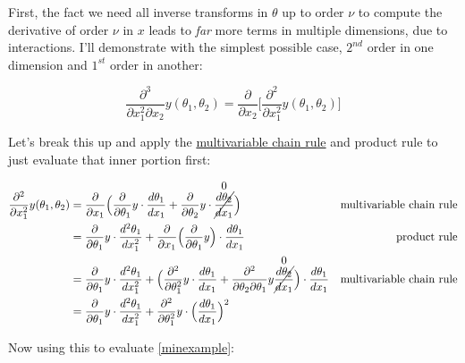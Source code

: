 \documentclass[10pt]{article}
\begin{document}
First, the fact we need all inverse transforms in $\theta$ up to order $\nu$ to compute the derivative of order $\nu$ in $x$ leads to \textit{far} more terms in multiple dimensions, due to interactions. I'll demonstrate with the simplest possible case, $2^{nd}$ order in one dimension and $1^{st}$ order in another:

\begin{equation}\label{minexample}
\frac{\partial^3}{\partial x_1^2 \partial x_2} y(\theta_1, \theta_2) = \frac{\partial}{\partial x_2} \Big[ \frac{\partial^2}{\partial x_1^2} y(\theta_1, \theta_2) \Big]
\end{equation}

Let's break this up and apply the \href{https://math.libretexts.org/Bookshelves/Calculus/Calculus_(OpenStax)/14%3A_Differentiation_of_Functions_of_Several_Variables/14.05%3A_The_Chain_Rule_for_Multivariable_Functions}{multivariable chain rule}\cite{chainrule} and product rule to just evaluate that inner portion first:

\begin{align*}
\frac{\partial^2}{\partial x_1^2} y(\theta_1, \theta_2) &= \frac{\partial}{\partial x_1} \Big( \frac{\partial}{\partial \theta_1} y \cdot \frac{d\theta_1}{dx_1} + \frac{\partial}{\partial \theta_2} y \cdot \overset{\text{\normalsize 0}}{\cancel{\frac{d\theta_2}{dx_1}}} \Big) & \text{multivariable chain rule}\\
&= \frac{\partial}{\partial \theta_1} y \cdot \frac{d^2 \theta_1}{dx_1^2} + \frac{\partial}{\partial x_1}\Big( \frac{\partial}{\partial \theta_1} y \Big) \cdot \frac{d\theta_1}{d x_1} & \text{product rule}\\
&= \frac{\partial}{\partial \theta_1} y \cdot \frac{d^2 \theta_1}{dx_1^2} + \Big( \frac{\partial^2}{\partial \theta_1^2} y \cdot \frac{d \theta_1}{dx_1} + \frac{\partial^2}{\partial \theta_2 \partial \theta_1} y \overset{\text{\normalsize 0}}{\cancel{\frac{d\theta_2}{dx_1}}} \Big) \cdot \frac{d\theta_1}{d x_1} & \text{multivariable chain rule}\\
&= \frac{\partial}{\partial \theta_1} y \cdot \frac{d^2 \theta_1}{dx_1^2} + \frac{\partial^2}{\partial \theta_1^2} y \cdot \Big( \frac{d \theta_1}{dx_1} \Big)^2
\end{align*}

Now using this to evaluate \autoref{minexample}:
\end{document}
